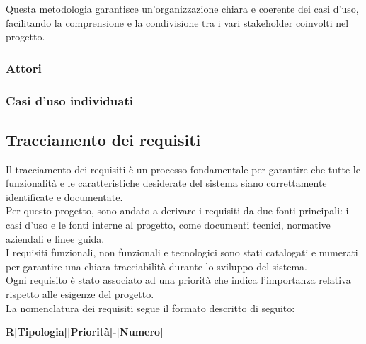 \noindent Questa metodologia garantisce un’organizzazione chiara e coerente dei casi d’uso, facilitando la comprensione e la condivisione tra i vari stakeholder coinvolti nel progetto.

\subsubsection{Attori}
\label{subsubsec:attori}



\pagebreak
\subsubsection{Casi d'uso individuati}
\label{subsubsec:casi-uso-individuati}



\pagebreak
\subsection{Tracciamento dei requisiti}
\label{subsec:requisiti}

Il tracciamento dei requisiti è un processo fondamentale per garantire che tutte le funzionalità e le caratteristiche desiderate del sistema siano correttamente identificate e documentate. \\
Per questo progetto, sono andato a derivare i requisiti da due fonti principali: i casi d'uso e le fonti interne al progetto, come documenti tecnici, normative aziendali e linee guida.\\ 

\noindent I requisiti funzionali, non funzionali e tecnologici sono stati catalogati e numerati per garantire una chiara tracciabilità durante lo sviluppo del sistema.\\
Ogni requisito è stato associato ad una priorità che indica l'importanza relativa rispetto alle esigenze del progetto.\\

\noindent La nomenclatura dei requisiti segue il formato descritto di seguito:

\begin{center}
\textbf{R[Tipologia][Priorità]-[Numero]}
\end{center}


